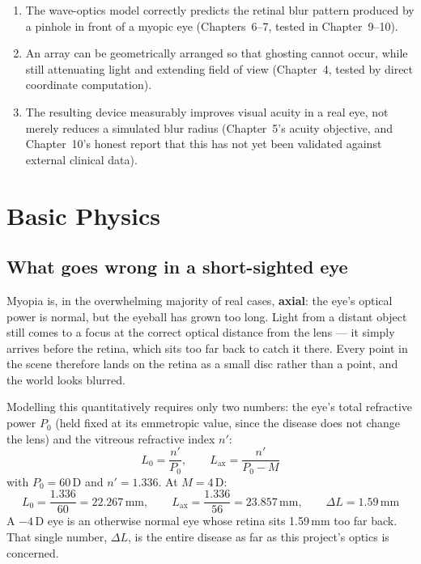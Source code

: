 \documentclass[11pt]{report}
\begin{document}
\begin{enumerate}[leftmargin=1.2cm]
\item The wave-optics model correctly predicts the retinal blur pattern produced by a
pinhole in front of a myopic eye (Chapters~6--7, tested in Chapter~9--10).
\item An array can be geometrically arranged so that ghosting cannot occur, while still
attenuating light and extending field of view (Chapter~4, tested by direct coordinate
computation).
\item The resulting device measurably improves visual acuity in a real eye, not merely
reduces a simulated blur radius (Chapter~5's acuity objective, and Chapter~10's honest
report that this has not yet been validated against external clinical data).
\end{enumerate}

\chapter{Basic Physics}

\section{What goes wrong in a short-sighted eye}

Myopia is, in the overwhelming majority of real cases, \textbf{axial}: the eye's optical
power is normal, but the eyeball has grown too long. Light from a distant object still
comes to a focus at the correct optical distance from the lens --- it simply arrives before
the retina, which sits too far back to catch it there. Every point in the scene therefore
lands on the retina as a small disc rather than a point, and the world looks blurred.

Modelling this quantitatively requires only two numbers: the eye's total refractive power
$P_0$ (held fixed at its emmetropic value, since the disease does not change the lens) and
the vitreous refractive index $n'$:
\begin{equation}
L_0 = \frac{n'}{P_0}, \qquad L_{\text{ax}} = \frac{n'}{P_0 - M}
\end{equation}
with $P_0 = 60$\,D and $n' = 1.336$. At $M = 4$\,D:
\begin{equation}
L_0 = \frac{1.336}{60} = 22.267\,\text{mm}, \qquad
L_{\text{ax}} = \frac{1.336}{56} = 23.857\,\text{mm}, \qquad \Delta L = 1.59\,\text{mm}
\end{equation}
A $-4$\,D eye is an otherwise normal eye whose retina sits 1.59\,mm too far back. That
single number, $\Delta L$, is the entire disease as far as this project's optics is
concerned.
\end{document}
